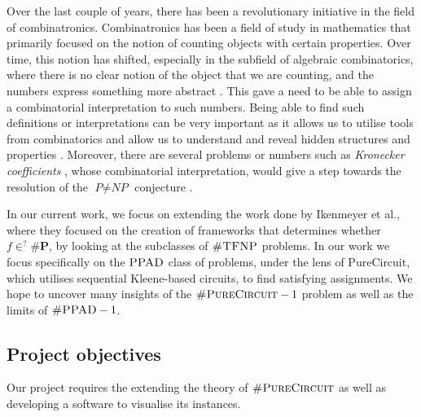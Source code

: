 Over the last couple of years, there has been a revolutionary
initiative in the field of combinatronics.
Combinatronics has been a field of study in mathematics that primarily focused on
the notion of counting objects with certain properties. Over time, this notion
has shifted, especially in the subfield of algebraic combinatorics, where
there is no clear notion of the object that we are counting,
and the numbers express something more abstract \cite{pak_WhatCombinatorialInterpretation_2022}.
This gave a need to be able to assign a combinatorial interpretation to such numbers.
Being able to find such definitions or interpretations can be very important
as it allows us to utilise tools from combinatorics and allow us to understand
and reveal hidden structures and properties \cite{pak_WhatCombinatorialInterpretation_2022}. 
Moreover, there are several problems or numbers such as \textit{Kronecker coefficients} \cite{makar_AnalysisKroneckerProduct_1949},
whose combinatorial interpretation, would give a step towards the resolution of the $\textit{P} \neq \textit{NP}$
conjecture \cite{ikenmeyer_WhatWhatNot_2022, ikenmeyer_VanishingKroneckerCoefficients_2017}.


In our current work, we focus on extending the work done by
Ikenmeyer et al., where they focused on the creation of frameworks
that determines whether $f \in^? \textbf{\#P}$, by looking
at the subclasses of $\textsc{\#TFNP}$ problems.
In our work we focus specifically on the $\textsc{PPAD}$ class of problems, under the lens of $\text{PureCircuit}$,
which utilises sequential Kleene-based circuits, to find satisfying assignments.
We hope to uncover many insights of the $\textsc{\#PureCircuit} -1$ problem 
as well as the limits of $\textsc{\#PPAD} -1$.



\subsection{Project objectives}

Our project requires the extending the theory of $\textsc{\#PureCircuit}$
as well as developing a software to visualise its instances.

